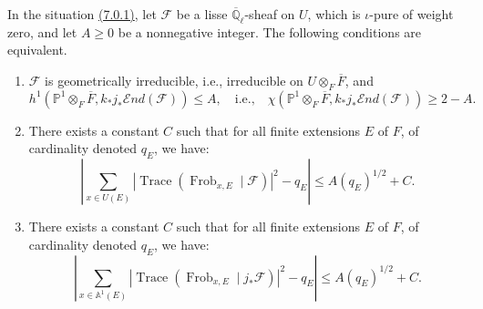 In the situation \hyperref[par:7.0.1]{(7.0.1)}, let \(\mathcal{F}\) be a lisse \(\overline{\mathbb{Q}}_\ell\)-sheaf on \(U\), which is \(\iota\)-pure of weight zero, and let \(A\geq0\) be a nonnegative integer. The following conditions are equivalent.
\begin{enumerate}[label=(\arabic*)]
\item \(\mathcal{F}\) is geometrically irreducible, i.e., irreducible on \(U\otimes_F\overline{F}\), and
\[
h^1(\mathbb{P}^1\otimes_F\overline{F},k_*j_*\mathcal{E}nd(\mathcal{F}))\leq A,
\quad\text{i.e.,}\quad
\chi(\mathbb{P}^1\otimes_F\overline{F},k_*j_*\mathcal{E}nd(\mathcal{F}))\geq 2-A.
\]
\item There exists a constant \(C\) such that for all finite extensions \(E\) of \(F\), of cardinality denoted \(q_E\), we have:
\[
\left|\sum_{x\in U(E)}|\operatorname{Trace}(\operatorname{Frob}_{x,E}\mid\mathcal{F})|^2-q_E\right|\leq A(q_E)^{1/2}+C.
\]
\item There exists a constant \(C\) such that for all finite extensions \(E\) of \(F\), of cardinality denoted \(q_E\), we have:
\[
\left|\sum_{x\in \mathbb{A}^1(E)}|\operatorname{Trace}(\operatorname{Frob}_{x,E}\mid j_*\mathcal{F})|^2-q_E\right|\leq A(q_E)^{1/2}+C.
\]
\end{enumerate}
